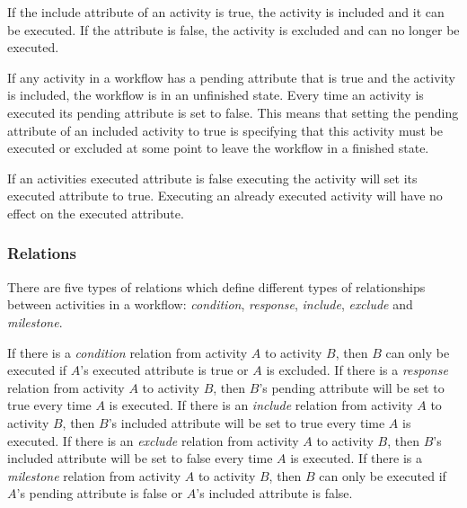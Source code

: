 \documentclass[12pt]{article}
\begin{document}
		If the include attribute of an activity is true, the activity is included and it can be executed. 
		If the attribute is false, the activity is excluded and can no longer be executed.

		If any activity in a workflow has a pending attribute that is true and the activity is included, the workflow is in an unfinished state.
		Every time an activity is executed its pending attribute is set to false.
		This means that setting the pending attribute of an included activity to true is specifying that this activity must be executed or excluded at some point to leave the workflow in a finished state.

		If an activities executed attribute is false executing the activity will set its executed attribute to true.
		Executing an already executed activity will have no effect on the executed attribute.

		\subsubsection{Relations}
		There are five types of relations which define different types of relationships between activities in a workflow: \textit{condition}, \textit{response}, \textit{include}, \textit{exclude} and \textit{milestone}.
		
		If there is a \textit{condition} relation from activity $A$ to activity $B$, then $B$ can only be executed if $A$'s executed attribute is true or $A$ is excluded.
		If there is a \textit{response} relation from activity $A$ to activity $B$, then $B$'s pending attribute will be set to true every time $A$ is executed.
		If there is an \textit{include} relation from activity $A$ to activity $B$, then $B$'s included attribute will be set to true every time $A$ is executed.
		If there is an \textit{exclude} relation from activity $A$ to activity $B$, then $B$'s included attribute will be set to false every time $A$ is executed.
		If there is a \textit{milestone} relation from activity $A$ to activity $B$, then $B$ can only be executed if $A$'s pending attribute is false or $A$'s included attribute is false.		
\end{document}

